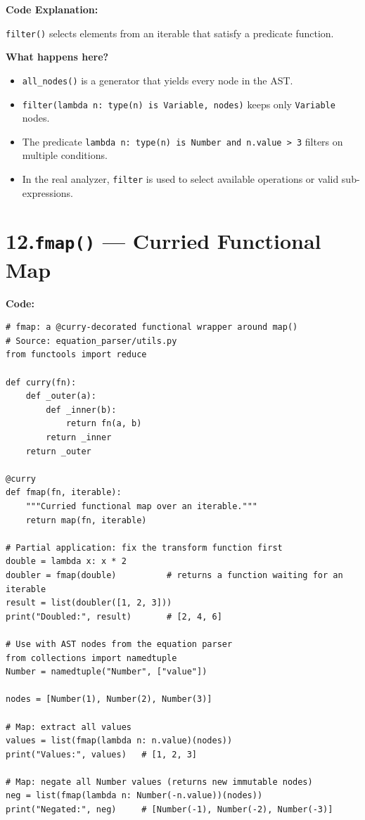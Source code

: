 \documentclass[12pt, a4paper]{article}
\begin{document}
\textbf{Code Explanation:}

\texttt{filter()} selects elements from an iterable that satisfy a predicate function.

\textbf{What happens here?}
\begin{itemize}
    \item \texttt{all\_nodes()} is a generator that yields every node in the AST.
    \item \texttt{filter(lambda n: type(n) is Variable, nodes)} keeps only \texttt{Variable} nodes.
    \item The predicate \texttt{lambda n: type(n) is Number and n.value > 3} filters on multiple conditions.
    \item In the real analyzer, \texttt{filter} is used to select available operations or valid sub-expressions.
\end{itemize}

\newpage
\section{12.\quad \texttt{fmap()} --- Curried Functional Map}

\textbf{Code:}

\begin{lstlisting}
# fmap: a @curry-decorated functional wrapper around map()
# Source: equation_parser/utils.py
from functools import reduce

def curry(fn):
    def _outer(a):
        def _inner(b):
            return fn(a, b)
        return _inner
    return _outer

@curry
def fmap(fn, iterable):
    """Curried functional map over an iterable."""
    return map(fn, iterable)

# Partial application: fix the transform function first
double = lambda x: x * 2
doubler = fmap(double)          # returns a function waiting for an iterable
result = list(doubler([1, 2, 3]))
print("Doubled:", result)       # [2, 4, 6]

# Use with AST nodes from the equation parser
from collections import namedtuple
Number = namedtuple("Number", ["value"])

nodes = [Number(1), Number(2), Number(3)]

# Map: extract all values
values = list(fmap(lambda n: n.value)(nodes))
print("Values:", values)   # [1, 2, 3]

# Map: negate all Number values (returns new immutable nodes)
neg = list(fmap(lambda n: Number(-n.value))(nodes))
print("Negated:", neg)     # [Number(-1), Number(-2), Number(-3)]
\end{lstlisting}
\end{document}
